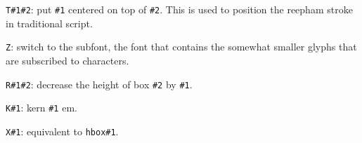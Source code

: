 {\tt\bslash T\#1\#2}: put {\tt\#1} centered on top of {\tt\#2}. This is
used to position the reepham stroke in traditional script.

{\tt\bslash Z}: switch to the subfont, the font that contains the
somewhat smaller glyphs that are subscribed to characters.

{\tt\bslash R\#1\#2}: decrease the height of box {\tt\#2} by {\tt\#1}.

{\tt\bslash K\#1}: kern {\tt\#1} em.

{\tt\bslash X\#1}: equivalent to {\tt\bslash hbox\#1}.






\bye

